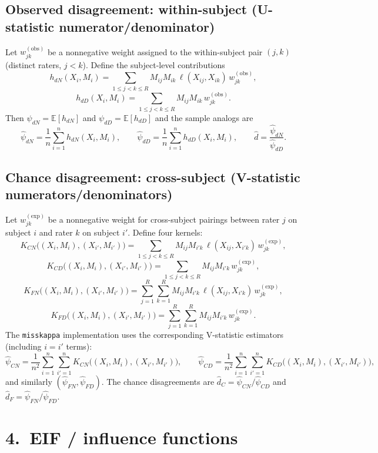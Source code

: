 \documentclass[11pt]{article}
\begin{document}
\subsection*{Observed disagreement: within-subject (U-statistic numerator/denominator)}

Let $w^{(\mathrm{obs})}_{jk}$ be a nonnegative weight assigned to the within-subject
pair $(j,k)$ (distinct raters, $j<k$). Define the subject-level contributions
\[
  h_{dN}(X_i,M_i)
  = \sum_{1\le j<k\le R} M_{ij}M_{ik}\,\ell(X_{ij},X_{ik})\,w^{(\mathrm{obs})}_{jk},
\]
\[
  h_{dD}(X_i,M_i)
  = \sum_{1\le j<k\le R} M_{ij}M_{ik}\,w^{(\mathrm{obs})}_{jk}.
\]
Then $\psi_{dN}=\mathbb{E}[h_{dN}]$ and $\psi_{dD}=\mathbb{E}[h_{dD}]$ and the
sample analogs are
\[
  \hat\psi_{dN} = \frac1n\sum_{i=1}^n h_{dN}(X_i,M_i),
  \qquad
  \hat\psi_{dD} = \frac1n\sum_{i=1}^n h_{dD}(X_i,M_i),
  \qquad
  \hat d = \frac{\hat\psi_{dN}}{\hat\psi_{dD}}.
\]

\subsection*{Chance disagreement: cross-subject (V-statistic numerators/denominators)}

Let $w^{(\mathrm{exp})}_{jk}$ be a nonnegative weight for cross-subject pairings
between rater $j$ on subject $i$ and rater $k$ on subject $i'$. Define four kernels:
\[
  K_{CN}\big((X_i,M_i),(X_{i'},M_{i'})\big)
  = \sum_{1\le j<k\le R} M_{ij}M_{i'k}\,\ell(X_{ij},X_{i'k})\,w^{(\mathrm{exp})}_{jk},
\]
\[
  K_{CD}\big((X_i,M_i),(X_{i'},M_{i'})\big)
  = \sum_{1\le j<k\le R} M_{ij}M_{i'k}\,w^{(\mathrm{exp})}_{jk},
\]
\[
  K_{FN}\big((X_i,M_i),(X_{i'},M_{i'})\big)
  = \sum_{j=1}^R\sum_{k=1}^R M_{ij}M_{i'k}\,\ell(X_{ij},X_{i'k})\,w^{(\mathrm{exp})}_{jk},
\]
\[
  K_{FD}\big((X_i,M_i),(X_{i'},M_{i'})\big)
  = \sum_{j=1}^R\sum_{k=1}^R M_{ij}M_{i'k}\,w^{(\mathrm{exp})}_{jk}.
\]
The \texttt{misskappa} implementation uses the corresponding V-statistic
estimators (including $i=i'$ terms):
\[
  \hat\psi_{CN} = \frac{1}{n^2}\sum_{i=1}^n\sum_{i'=1}^n K_{CN}\big((X_i,M_i),(X_{i'},M_{i'})\big),
  \qquad
  \hat\psi_{CD} = \frac{1}{n^2}\sum_{i=1}^n\sum_{i'=1}^n K_{CD}\big((X_i,M_i),(X_{i'},M_{i'})\big),
\]
and similarly $(\hat\psi_{FN},\hat\psi_{FD})$. The chance disagreements are
$\hat d_C=\hat\psi_{CN}/\hat\psi_{CD}$ and $\hat d_F=\hat\psi_{FN}/\hat\psi_{FD}$.

\section*{4.\ EIF / influence functions}
\end{document}
